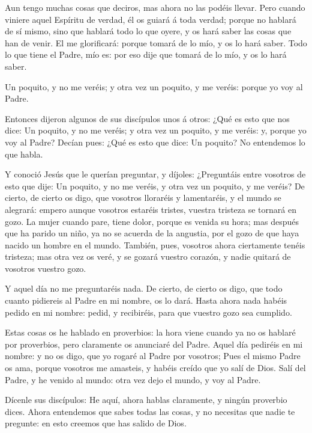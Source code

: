  Aun tengo muchas cosas que deciros, mas ahora no las
podéis llevar.  Pero cuando viniere aquel Espíritu de
verdad, él os guiará á toda verdad; porque no hablará de sí mismo, sino
que hablará todo lo que oyere, y os hará saber las cosas que han de
venir.  El me glorificará: porque tomará de lo mío, y os lo
hará saber.  Todo lo que tiene el Padre, mío es: por eso
dije que tomará de lo mío, y os lo hará saber.

 Un poquito, y no me veréis; y otra vez un poquito, y me
veréis: porque yo voy al Padre.

 Entonces dijeron algunos de sus discípulos unos á otros:
¿Qué es esto que nos dice: Un poquito, y no me veréis; y otra vez un
poquito, y me veréis: y, porque yo voy al Padre?  Decían
pues: ¿Qué es esto que dice: Un poquito? No entendemos lo que habla.

 Y conoció Jesús que le querían preguntar, y díjoles:
¿Preguntáis entre vosotros de esto que dije: Un poquito, y no me veréis,
y otra vez un poquito, y me veréis?  De cierto, de cierto
os digo, que vosotros lloraréis y lamentaréis, y el mundo se alegrará:
empero aunque vosotros estaréis tristes, vuestra tristeza se tornará en
gozo.  La mujer cuando pare, tiene dolor, porque es venida
su hora; mas después que ha parido un niño, ya no se acuerda de la
angustia, por el gozo de que haya nacido un hombre en el mundo.
 También, pues, vosotros ahora ciertamente tenéis tristeza;
mas otra vez os veré, y se gozará vuestro corazón, y nadie quitará de
vosotros vuestro gozo.

 Y aquel día no me preguntaréis nada. De cierto, de cierto
os digo, que todo cuanto pidiereis al Padre en mi nombre, os lo dará.
 Hasta ahora nada habéis pedido en mi nombre: pedid, y
recibiréis, para que vuestro gozo sea cumplido.

 Estas cosas os he hablado en proverbios: la hora viene
cuando ya no os hablaré por proverbios, pero claramente os anunciaré del
Padre.  Aquel día pediréis en mi nombre: y no os digo, que
yo rogaré al Padre por vosotros;  Pues el mismo Padre os
ama, porque vosotros me amasteis, y habéis creído que yo salí de Dios.
 Salí del Padre, y he venido al mundo: otra vez dejo el
mundo, y voy al Padre.

 Dícenle sus discípulos: He aquí, ahora hablas claramente,
y ningún proverbio dices.  Ahora entendemos que sabes todas
las cosas, y no necesitas que nadie te pregunte: en esto creemos que has
salido de Dios.

